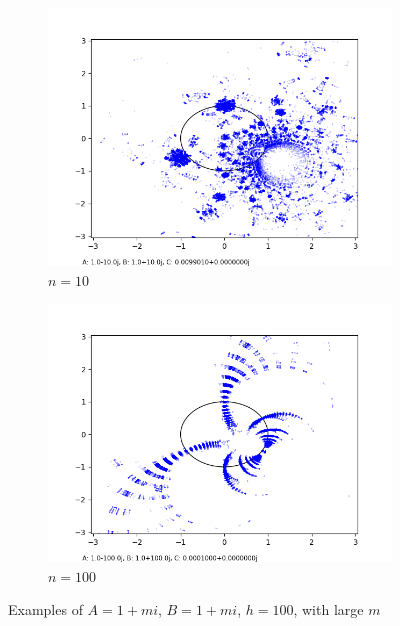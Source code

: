 \documentclass[12pt,a4paper,reqno,parskip=full]{amsart}
\numberwithin{equation}{section}
\theoremstyle{plain}
\theoremstyle{definition}
\begin{document}
\begin{figure}[H]
\begin{subfigure}[b]{0.3\textwidth}
         \includegraphics[width=\textwidth]{images/nn/a-10 b10 h30 d0.01.png}
         \caption{$n=10$}
         \label{fig:n10}
    \end{subfigure}
     \begin{subfigure}[b]{0.3\textwidth}
         \centering
         \includegraphics[width=\textwidth]{images/nn/a-100 b100 h40 d0.025.png}
         \caption{$n=100$}
         \label{fig:n100}
    \end{subfigure}
    \caption{Examples of $A=1+mi$, $B=1+mi$, $h=100$, with large $m$}
    \label{fig:nn}
\end{figure}

\newpage
\appendix
\appendixpage
\addappheadtotoc
\end{document}
